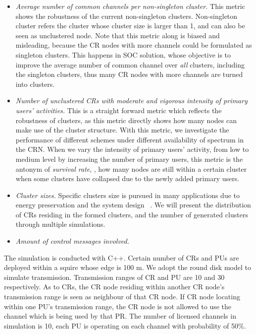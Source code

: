 \begin{itemize}
\item \textit{Average number of common channels per non-singleton cluster.} 
This metric shows the robustness of the current non-singleton clusters.
Non-singleton cluster refers the cluster whose cluster size is larger than 1, and can also be seen as unclustered node.
Note that this metric along is biased and misleading, because the CR nodes with more channels could be formulated as singleton clusters.
This happens in SOC solution, whose objective is to improve the average number of common channel over \textit{all} clusters, \ie including the singleton clusters, thus many CR nodes with more channels are turned into clusters.


\item \textit{Number of unclustered CRs with moderate and vigorous intensity of primary users' activities.}
This is a straight forward metric which reflects the robustness of clusters, as this metric directly shows how many nodes can make use of the cluster structure.
With this metric, we investigate the performance of different schemes under different availability of spectrum in the CRN.
When we vary the intensity of primary users' activity, \eg from low to medium level by increasing the number of primary users, this metric is the antonym of \textit{survival rate}, \ie, how many nodes are still within a certain cluster when some clusters have collapsed due to the newly added primary users.


\item \textit{Cluster sizes.}
Specific clusters size is pursued in many applications due to energy preservation and the system design ~\cite{clustering_globecom11}.
We will present the distribution of CRs residing in the formed clusters, and the number of generated clusters through multiple simulations.

\item \textit{Amount of control messages involved.}

\end{itemize}

The simulation is conducted with C++. 
Certain number of CRs and PUs are deployed within a squire whose edge is 100 m.
We adopt the round disk model to simulate transmission.
Transmission ranges of CR and PU are 10 and 30 respectively.
As to CRs, the CR node residing within another CR node's transmission range is seen as neighbour of that CR node.
If CR node locating within one PU's transmission range, the CR node is not allowed to use the channel which is being used by that PR.
The number of licensed channels in simulation is 10, each PU is operating on each channel with probability of 50\%.

